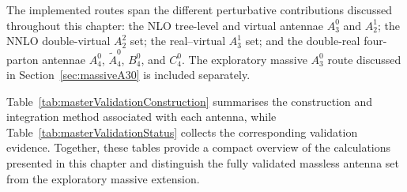 The implemented routes span the different perturbative contributions discussed throughout this
chapter: the NLO tree-level and virtual antennae $A_3^0$ and $A_2^1$; the NNLO double-virtual
$A_2^2$ set; the real--virtual $A_3^1$ set; and the double-real four-parton antennae $A_4^0$,
$\widetilde A_4^0$, $B_4^0$, and $C_4^0$. The exploratory massive $A_3^0$ route discussed in
Section~\ref{sec:massiveA30} is included separately.

Table~\ref{tab:masterValidationConstruction} summarises the construction and integration method
associated with each antenna, while Table~\ref{tab:masterValidationStatus} collects the
corresponding validation evidence. Together, these tables provide a compact overview of the
calculations presented in this chapter and distinguish the fully validated massless antenna set
from the exploratory massive extension.

